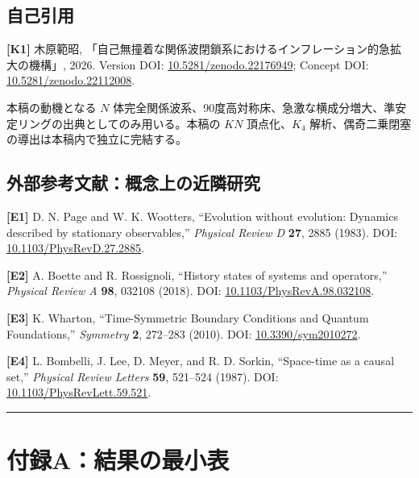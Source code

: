 \documentclass[
  a4paper,
]{ltjsarticle}
\begin{document}
\subsection{自己引用}\label{ux81eaux5df1ux5f15ux7528}

\textbf{{[}K1{]}} 木原範昭,
「自己無撞着な関係波閉鎖系におけるインフレーション的急拡大の機構」,
2026. Version DOI:
\href{https://doi.org/10.5281/zenodo.22176949}{10.5281/zenodo.22176949};
Concept DOI:
\href{https://doi.org/10.5281/zenodo.22112008}{10.5281/zenodo.22112008}.

本稿の動機となる \(N\)
体完全関係波系、90度高対称床、急激な横成分増大、準安定リングの出典としてのみ用いる。本稿の
\(KN\) 頂点化、\(K_4\)
解析、偶奇二乗閉塞の導出は本稿内で独立に完結する。

\subsection{外部参考文献：概念上の近隣研究}\label{ux5916ux90e8ux53c2ux8003ux6587ux732eux6982ux5ff5ux4e0aux306eux8fd1ux96a3ux7814ux7a76}

\textbf{{[}E1{]}} D. N. Page and W. K. Wootters, ``Evolution without
evolution: Dynamics described by stationary observables,''
\emph{Physical Review D} \textbf{27}, 2885 (1983). DOI:
\href{https://doi.org/10.1103/PhysRevD.27.2885}{10.1103/PhysRevD.27.2885}.

\textbf{{[}E2{]}} A. Boette and R. Rossignoli, ``History states of
systems and operators,'' \emph{Physical Review A} \textbf{98}, 032108
(2018). DOI:
\href{https://doi.org/10.1103/PhysRevA.98.032108}{10.1103/PhysRevA.98.032108}.

\textbf{{[}E3{]}} K. Wharton, ``Time-Symmetric Boundary Conditions and
Quantum Foundations,'' \emph{Symmetry} \textbf{2}, 272--283 (2010). DOI:
\href{https://doi.org/10.3390/sym2010272}{10.3390/sym2010272}.

\textbf{{[}E4{]}} L. Bombelli, J. Lee, D. Meyer, and R. D. Sorkin,
``Space-time as a causal set,'' \emph{Physical Review Letters}
\textbf{59}, 521--524 (1987). DOI:
\href{https://doi.org/10.1103/PhysRevLett.59.521}{10.1103/PhysRevLett.59.521}.

\begin{center}\rule{0.5\linewidth}{0.5pt}\end{center}

\section{付録A：結果の最小表}\label{ux4ed8ux9332aux7d50ux679cux306eux6700ux5c0fux8868}
\end{document}
